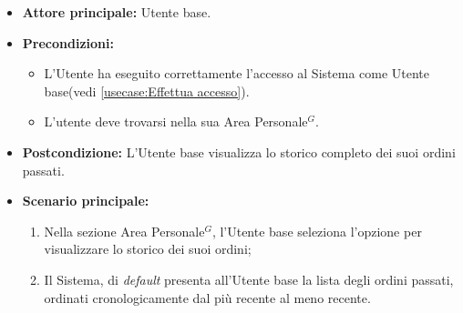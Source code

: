 \label{usecase:Storico ordini}
\begin{itemize}
	\item \textbf{Attore principale:} Utente base.

	\item \textbf{Precondizioni:}
	\begin{itemize}
        \item L'Utente ha eseguito correttamente l'accesso al Sistema come Utente base(vedi \autoref{usecase:Effettua accesso}).
        \item L'utente deve trovarsi nella sua Area Personale$^G$.
    \end{itemize}

	\item \textbf{Postcondizione:} L'Utente base visualizza lo storico completo dei suoi ordini passati.

	\item \textbf{Scenario principale:}
	      \begin{enumerate}
		      \item Nella sezione Area Personale$^G$, l'Utente base seleziona l'opzione per visualizzare lo storico dei suoi ordini;
		      \item Il Sistema, di \textit{default} presenta all'Utente base la lista degli ordini passati, ordinati cronologicamente dal più recente al meno recente.
	      \end{enumerate}
\end{itemize}

